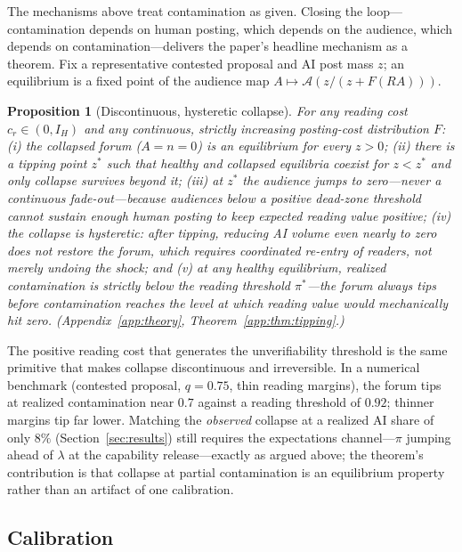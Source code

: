 \documentclass[12pt]{article}
\newtheorem{proposition}{Proposition}
\begin{document}
The mechanisms above treat contamination as given. Closing the loop---contamination depends on human posting, which depends on the audience, which depends on contamination---delivers the paper's headline mechanism as a theorem. Fix a representative contested proposal and AI post mass $z$; an equilibrium is a fixed point of the audience map $A \mapsto \mathcal{A}\!\left(z/(z + F(RA))\right)$.

\begin{proposition}[Discontinuous, hysteretic collapse]
\label{prop:tipping}
For any reading cost $c_r \in (0, I_H)$ and any continuous, strictly increasing posting-cost distribution $F$: (i) the collapsed forum ($A = n = 0$) is an equilibrium for every $z > 0$; (ii) there is a tipping point $z^*$ such that healthy and collapsed equilibria coexist for $z < z^*$ and only collapse survives beyond it; (iii) at $z^*$ the audience \emph{jumps} to zero---never a continuous fade-out---because audiences below a positive dead-zone threshold cannot sustain enough human posting to keep expected reading value positive; (iv) the collapse is \emph{hysteretic}: after tipping, reducing AI volume even nearly to zero does not restore the forum, which requires coordinated re-entry of readers, not merely undoing the shock; and (v) at any healthy equilibrium, realized contamination is \emph{strictly below} the reading threshold $\pi^*$---the forum always tips before contamination reaches the level at which reading value would mechanically hit zero. (Appendix~\ref{app:theory}, Theorem~\ref{app:thm:tipping}.)
\end{proposition}

The positive reading cost that generates the unverifiability threshold is the same primitive that makes collapse discontinuous and irreversible. In a numerical benchmark (contested proposal, $q = 0.75$, thin reading margins), the forum tips at realized contamination near $0.7$ against a reading threshold of $0.92$; thinner margins tip far lower. Matching the \emph{observed} collapse at a realized AI share of only $8\%$ (Section~\ref{sec:results}) still requires the expectations channel---$\pi$ jumping ahead of $\lambda$ at the capability release---exactly as argued above; the theorem's contribution is that collapse at partial contamination is an equilibrium property rather than an artifact of one calibration.

\subsection{Calibration}
\label{sec:calibration}
\end{document}
